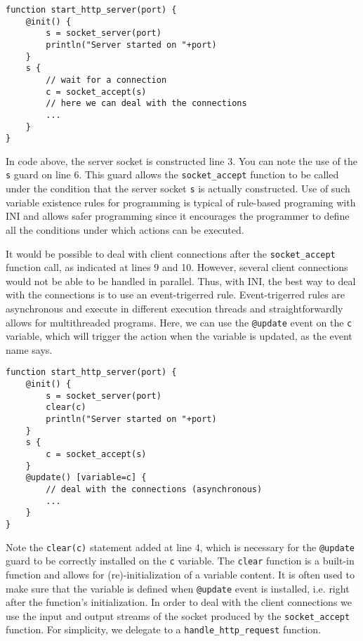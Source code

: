 \documentclass[11pt]{report}
\begin{document}
\begin{lstlisting}
function start_http_server(port) {
	@init() {
		s = socket_server(port)
		println("Server started on "+port)
	}
	s {
		// wait for a connection
		c = socket_accept(s)
		// here we can deal with the connections
		...
	}
}
\end{lstlisting}

In code above, the server socket is constructed line 3. You can note the use of the \texttt{s} guard on line 6. This guard allows the \texttt{socket\_accept} function to be called under the condition that the server socket \texttt{s} is actually constructed. Use of such variable existence rules for programming is typical of rule-based programing with INI and allows safer programming since it encourages the programmer to define all the conditions under which actions can be executed.

It would be possible to deal with client connections after the \texttt{socket\_accept} function call, as indicated at lines 9 and 10. However, several client connections would not be able to be handled in parallel. Thus, with INI, the best way to deal with the connections is to use an event-trigerred rule. Event-trigerred rules are asynchronous and execute in different execution threads and straightforwardly allows for multithreaded programs. Here, we can use the \texttt{@update} event on the \texttt{c} variable, which will trigger the action when the variable is updated, as the event name says.

\begin{lstlisting}
function start_http_server(port) {
	@init() {
		s = socket_server(port)
		clear(c)
		println("Server started on "+port)
	}
	s {
		c = socket_accept(s)
	}
	@update() [variable=c] {
		// deal with the connections (asynchronous)
		...
	}
}
\end{lstlisting}

Note the \texttt{clear(c)} statement added at line 4, which is necessary for the \texttt{@update} guard to be correctly installed on the \texttt{c} variable. The \texttt{clear} function is a built-in function and allows for (re)-initialization of a variable content. It is often used to make sure that the variable is defined when \texttt{@update} event is installed, i.e. right after the function's initialization. In order to deal with the client connections we use the input and output streams of the socket produced by the \texttt{socket\_accept} function. For simplicity, we delegate to a \texttt{handle\_http\_request} function.
\end{document}
